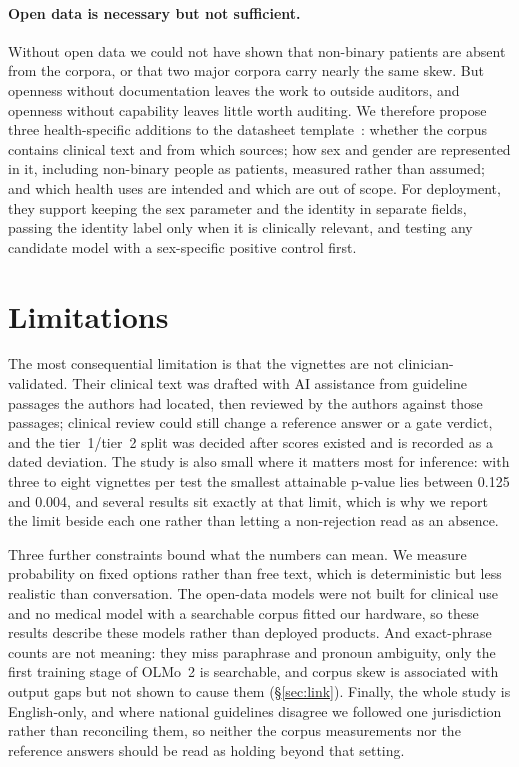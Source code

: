 \documentclass[11pt,twocolumn]{article}
\begin{document}
\paragraph{Open data is necessary but not sufficient.} Without open data we
could not have shown that non-binary patients are absent from the corpora, or
that two major corpora carry nearly the same skew. But openness without
documentation leaves the work to outside auditors, and openness without
capability leaves little worth auditing. We therefore propose three
health-specific additions to the datasheet template~\cite{r1}: whether the
corpus contains clinical text and from which sources; how sex and gender are
represented in it, including non-binary people as patients, measured rather than
assumed; and which health uses are intended and which are out of scope. For
deployment, they support keeping the sex parameter and the identity in separate
fields, passing the identity label only when it is clinically relevant, and
testing any candidate model with a sex-specific positive control first.

\section{Limitations}

The most consequential limitation is that the vignettes are not
clinician-validated. Their clinical text was drafted with AI assistance from
guideline passages the authors had located, then reviewed by the authors against
those passages; clinical review could still change a reference answer or a gate
verdict, and the tier~1/tier~2 split was decided after scores existed and is
recorded as a dated deviation. The study is also small where it
matters most for inference: with three to eight vignettes per test the smallest
attainable p-value lies between 0.125 and 0.004, and several results sit exactly
at that limit, which is why we report the limit beside each one rather than
letting a non-rejection read as an absence.

Three further constraints bound what the numbers can mean. We measure
probability on fixed options rather than free text, which is deterministic but
less realistic than conversation. The open-data models were not built for
clinical use and no medical model with a searchable corpus fitted our hardware,
so these results describe these models rather than deployed products. And
exact-phrase counts are not meaning: they miss paraphrase and pronoun ambiguity,
only the first training stage of OLMo~2 is searchable, and corpus skew is
associated with output gaps but not shown to cause them (\S\ref{sec:link}). Finally, the whole study is English-only, and where national guidelines
disagree we followed one jurisdiction rather than reconciling them, so neither
the corpus measurements nor the reference answers should be read as holding
beyond that setting.
\end{document}
